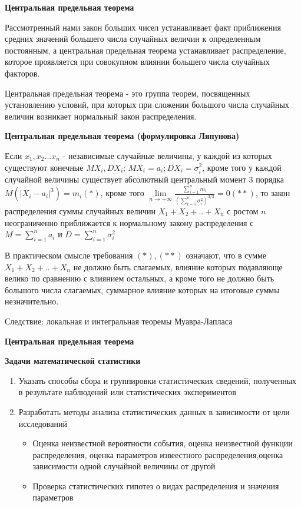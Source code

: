 \begin{center}
    \textbf{Центральная предельная теорема}
\end{center} 

Рассмотренный нами закон больших чисел устанавливает факт приближения средних значений большего числа случайных величин к определенным постоянным, а центральная предельная теорема 
устанавливает распределение, которое проявляется при совокупном влиянии большего числа случайных факторов.

Центральная предельная теорема - это группа теорем, посвященных установлению условий, при которых при сложении большого числа случайных величин возникает нормальный закон распределения.

\textbf{Центральная предельная теорема (формулировка Ляпунова)}

Если $x_1,x_2 ... x_n$ - независимые случайные величины, у каждой из которых существуют конечные $MX_i,DX_i$; $MX_i=a_i; DX_i= \sigma_i^2$, кроме того у каждой случайной величины существует абсолютный центральный момент 3 порядка 
$M(|X_i-a_i|^3)=m_i(*)$, кроме того $\lim \limits_{n \to + \infty} {\frac{\sum \limits_{i=1}^{n}{m_i}}{(\sum \limits_{i=1}^{n}{\sigma_i^2})^{3/2}}}=0(**)$, то закон распределения суммы случайных величин $X_1+X_2+ .. +X_n$ с ростом $n$ 
неограниченно приближается к нормальному закону распределения с $M=\sum \limits_{i=1}^{n}{a_i}$ и $D=\sum \limits_{i=1}^{n}{\sigma_i^2}$

В практическом смысле требования $(*),(**)$ означают, что в сумме $X_1+X_2+ .. +X_n$ не должно быть слагаемых, влияние которых подавляюще велико по сравнению с влиянием остальных, а кроме того не должно быть большого числа слагаемых,
суммарное влияние которых на итоговые суммы незначительно.

Следствие: локальная и интегральная теоремы Муавра-Лапласа

\begin{center}
    \textbf{Центральная предельная теорема}
\end{center} 

\textbf{Задачи математической статистики}

\begin{enumerate}
 \item Указать способы сбора и группировки статистических сведений, полученных в результате наблюдений или статистических экспериментов
 \item Разработать методы анализа статистических данных в зависимости от цели исследований
       \begin{itemize}
        \item Оценка неизвестной вероятности события, оценка неизвестной функции распределения, оценка параметров извеестного распределения,оценка зависимости одной случайной величины от другой
        \item Проверка статистических гипотез о видах распределения и значения параметров
       \end{itemize}
\end{enumerate}

